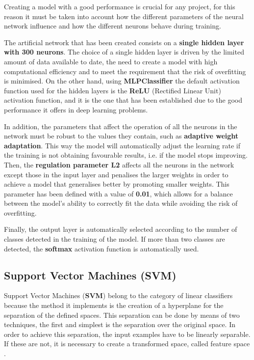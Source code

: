 Creating a model with a good performance is crucial for any project, for this reason it must be taken into account how the different parameters of the neural network influence and how the different neurons behave during training. 

The artificial network that has been created consists on a \textbf{single hidden layer with 300 neurons}. The choice of a single hidden layer is driven by the limited amount of data available to date, the need to create a model with high computational efficiency and to meet the requirement that the risk of overfitting is minimised. On the other hand, using \textbf{MLPClassifier} the default activation function used for the hidden layers is the \textbf{ReLU} (Rectified Linear Unit) activation function, and it is the one that has been established due to the good performance it offers in deep learning problems. 

In addition, the parameters that affect the operation of all the neurons in the network must be robust to the values they contain, such as \textbf{adaptive weight adaptation}. This way the model will automatically adjust the learning rate if the training is not obtaining favourable results, i.e. if the model stops improving. Then, the \textbf{regulation parameter L2} affects all the neurons in the network except those in the input layer and penalises the larger weights in order to achieve a model that generalises better by promoting smaller weights. This parameter has been defined with a value of \textbf{0.01}, which allows for a balance between the model's ability to correctly fit the data while avoiding the risk of overfitting. 
 
Finally, the output layer is automatically selected according to the number of classes detected in the training of the model. If more than two classes are detected, the \textbf{softmax} activation function is automatically used. 


\subsection{Support Vector Machines (SVM)}

Support Vector Machines (\textbf{SVM}) belong to the category of linear classifiers because the method it implements is the creation of a hyperplane for the separation of the defined spaces. This separation can be done by means of two techniques, the first and simplest is the separation over the original space. In order to achieve this separation, the input examples have to be linearly separable. If these are not, it is necessary to create a transformed space, called feature space \cite{Mercado2015}. 

